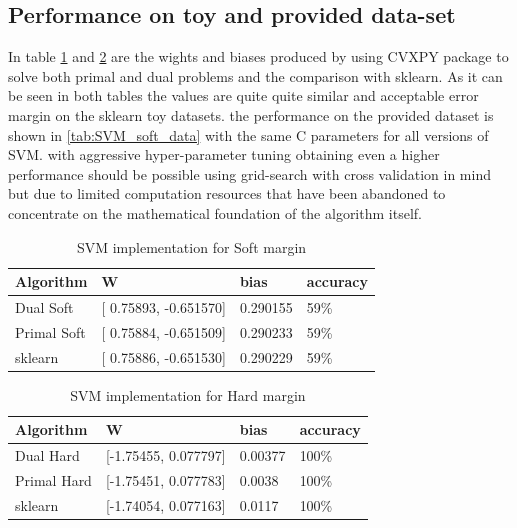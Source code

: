 \documentclass[10pt,twocolumn,letterpaper]{article}
\begin{document}
\subsection{Performance on toy and provided data-set}
In table \ref{tab:SVM_soft} and \ref{tab:SVM_hard} are the wights and biases produced by using CVXPY package to solve both primal and dual problems and the comparison with sklearn. As it can be seen in both tables the values are quite quite similar and acceptable error margin on the sklearn toy datasets. the performance on the provided dataset is shown in \ref{tab:SVM_soft_data} with the same C parameters for all versions of SVM. with aggressive hyper-parameter tuning obtaining even a higher performance should be possible using grid-search with cross validation in mind but due to limited computation resources that have been abandoned to concentrate on the mathematical foundation of the algorithm itself.


\begin{table}[htb]
\centering
\begin{tabular}{|l|l|l|l|} 
\toprule
Algorithm   & W                           & bias       & accuracy  \\ 
\hline
Dual Soft   & {[} 0.75893, -0.651570] & 0.290155 & 59\%      \\ 
\hline
Primal Soft & {[} 0.75884, -0.651509] & 0.290233 & 59\%      \\ 
\hline
sklearn     & {[} 0.75886, -0.651530] & 0.290229 & 59\%      \\
\bottomrule
\end{tabular}
\caption{SVM implementation for Soft margin}
\label{tab:SVM_soft}
\end{table}



\begin{table}[htb]
\centering
\begin{tabular}{|l|l|l|l|} 
\toprule
Algorithm   & W                        & bias      & accuracy  \\ 
\hline
Dual Hard   & {[}-1.75455, 0.077797] & 0.00377 & 100\%     \\ 
\hline
Primal Hard & {[}-1.75451, 0.077783]  & 0.0038 & 100\%     \\ 
\hline
sklearn     & {[}-1.74054, 0.077163]  & 0.0117 & 100\%     \\
\bottomrule
\end{tabular}
\caption{SVM implementation for Hard margin}
\label{tab:SVM_hard}
\end{table}
\end{document}
